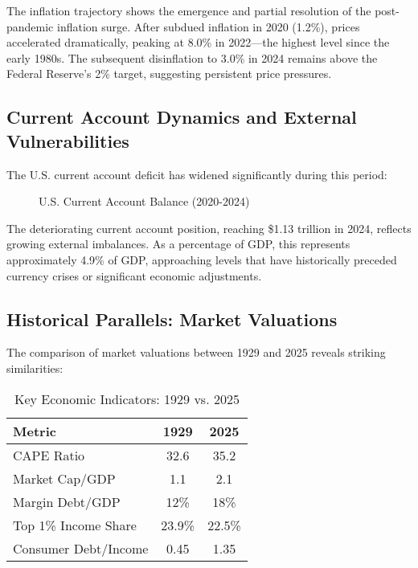 \documentclass[12pt,letterpaper]{article}
\begin{document}
The inflation trajectory shows the emergence and partial resolution of the post-pandemic inflation surge. After subdued inflation in 2020 (1.2\%), prices accelerated dramatically, peaking at 8.0\% in 2022—the highest level since the early 1980s. The subsequent disinflation to 3.0\% in 2024 remains above the Federal Reserve's 2\% target, suggesting persistent price pressures.

\subsection{Current Account Dynamics and External Vulnerabilities}

The U.S. current account deficit has widened significantly during this period:

\begin{figure}[H]
\centering
{}
\caption{U.S. Current Account Balance (2020-2024)}
\label{fig:current_account}
\end{figure}

The deteriorating current account position, reaching \$1.13 trillion in 2024, reflects growing external imbalances. As a percentage of GDP, this represents approximately 4.9\% of GDP, approaching levels that have historically preceded currency crises or significant economic adjustments.

\subsection{Historical Parallels: Market Valuations}

The comparison of market valuations between 1929 and 2025 reveals striking similarities:

\begin{table}[H]
\centering
\begin{tabular}{lcc}
\toprule
\textbf{Metric} & \textbf{1929} & \textbf{2025} \\
\midrule
CAPE Ratio & 32.6 & 35.2 \\
Market Cap/GDP & 1.1 & 2.1 \\
Margin Debt/GDP & 12\% & 18\% \\
Top 1\% Income Share & 23.9\% & 22.5\% \\
Consumer Debt/Income & 0.45 & 1.35 \\
\bottomrule
\end{tabular}
\caption{Key Economic Indicators: 1929 vs. 2025}
\label{tab:comparison}
\end{table}
\end{document}
